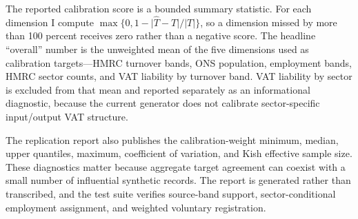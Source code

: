 The reported calibration score is a bounded summary statistic. For each
dimension I compute
\(\max\{0,1-\lvert \widehat{T}-T\rvert/\lvert T\rvert\}\), so a dimension missed
by more than 100 percent receives zero rather than a negative score. The headline
``overall'' number is the unweighted mean of the five dimensions used as
calibration targets---HMRC turnover bands, ONS population, employment bands,
HMRC sector counts, and VAT liability by turnover band. VAT liability by sector
is excluded from that mean and reported separately as an informational
diagnostic, because the current generator does not calibrate sector-specific
input/output VAT structure.

The replication report also publishes the calibration-weight minimum,
median, upper quantiles, maximum, coefficient of variation, and Kish effective
sample size. These diagnostics matter because aggregate target agreement can
coexist with a small number of influential synthetic records. The report is
generated rather than transcribed, and the test suite verifies source-band
support, sector-conditional employment assignment, and weighted voluntary
registration.

